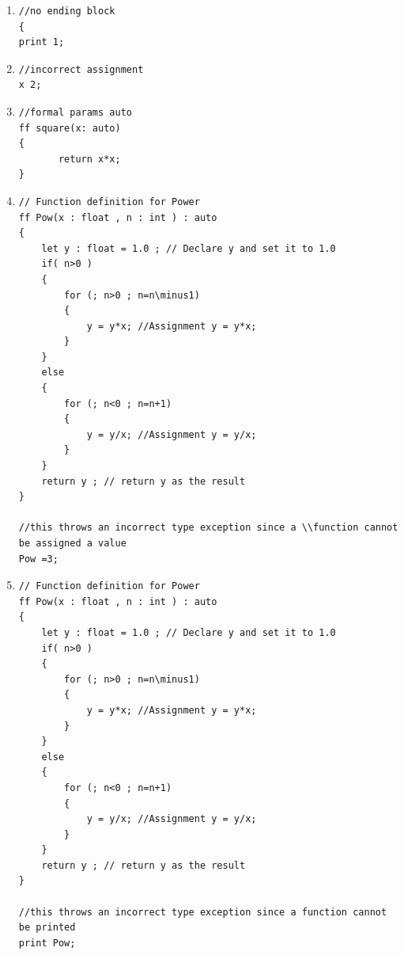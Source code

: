 \documentclass{article}
\begin{document}
\begin{enumerate}
				\item 
				\begin{lstlisting}[backgroundcolor=\color{lightgray}]
//no ending block
{
print 1;
				\end{lstlisting}
				
				\item 
				\begin{lstlisting}[backgroundcolor=\color{lightgray}]
//incorrect assignment
x 2;
				\end{lstlisting}
				
					\item 
				\begin{lstlisting}[backgroundcolor=\color{lightgray}]
//formal params auto
ff square(x: auto)
{
 	   return x*x;		
}
				\end{lstlisting}
				
\item 
\begin{lstlisting}[backgroundcolor=\color{lightgray}]
// Function definition for Power
ff Pow(x : float , n : int ) : auto
{
    let y : float = 1.0 ; // Declare y and set it to 1.0
    if( n>0 )
    {
        for (; n>0 ; n=n\minus1)
        {
            y = y*x; //Assignment y = y*x;
        }
    }
    else
    {
        for (; n<0 ; n=n+1)
        {
            y = y/x; //Assignment y = y/x;
        }
    }
    return y ; // return y as the result
}

//this throws an incorrect type exception since a \\function cannot be assigned a value
Pow =3;
\end{lstlisting}

\item 
\begin{lstlisting}[backgroundcolor=\color{lightgray}]
// Function definition for Power
ff Pow(x : float , n : int ) : auto
{
    let y : float = 1.0 ; // Declare y and set it to 1.0
    if( n>0 )
    {
        for (; n>0 ; n=n\minus1)
        {
            y = y*x; //Assignment y = y*x;
        }
    }
    else
    {
        for (; n<0 ; n=n+1)
        {
            y = y/x; //Assignment y = y/x;
        }
    }
    return y ; // return y as the result
}

//this throws an incorrect type exception since a function cannot be printed
print Pow;
\end{lstlisting}
				
				
				
				\end{enumerate}
				
\end{document}
